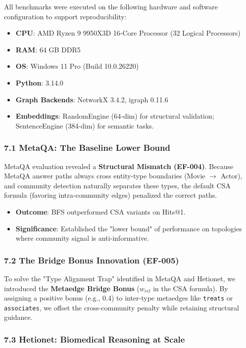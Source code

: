 \documentclass[10pt,journal,compsoc]{IEEEtran}
\begin{document}
All benchmarks were executed on the following hardware and software confi\-guration to support repro\-ducibility:

\begin{itemize}
\item \textbf{CPU}: AMD Ryzen 9 9950X3D 16-Core Processor (32 Logical Processors)
\item \textbf{RAM}: 64 GB DDR5
\item \textbf{OS}: Windows 11 Pro (Build 10.0.26220)
\item \textbf{Python}: 3.14.0
\item \textbf{Graph Backends}: NetworkX 3.4.2, igraph 0.11.6
\item \textbf{Embeddings}: RandomEngine (64-dim) for structural validation; SentenceEngine (384-dim) for semantic tasks.

\end{itemize}
\subsubsection{7.1 MetaQA: The Baseline Lower Bound}

MetaQA evaluation revealed a \textbf{Structural Mismatch (EF-004)}. Because MetaQA answer paths always cross entity-type boundaries (Movie $\to$ Actor), and community detection naturally separates these types, the default CSA formula (favoring intra-community edges) penalized the correct paths.

\begin{itemize}
\item \textbf{Outcome}: BFS outpe\-rformed CSA variants on Hits@1.
\item \textbf{Signif\-icance}: Established the "lower bound" of performance on topologies where community signal is anti-informative.

\end{itemize}
\subsubsection{7.2 The Bridge Bonus Innovation (EF-005)}

To solve the "Type Alignment Trap" identified in MetaQA and Hetionet, we introduced the \textbf{Metaedge Bridge Bonus} ($w_{rel}$ in the CSA formula). By assigning a positive bonus (e.g., 0.4) to inter-type metaedges like \texttt{treats} or \texttt{associates}, we offset the cross-community penalty while retaining structural guidance.

\subsubsection{7.3 Hetionet: Biomedical Reasoning at Scale}
\end{document}
